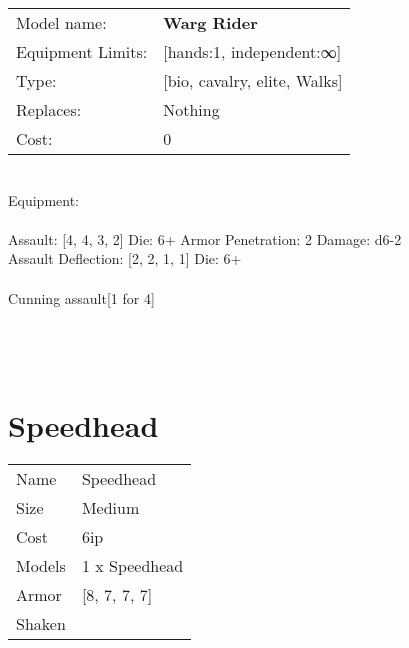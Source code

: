 \noindent
\begin{tabular}{ll}
Model name: &{\bf Warg Rider } \\
Equipment Limits: &[hands:1, independent:∞] \\
Type: &[bio, cavalry, elite, Walks] \\
Replaces: &Nothing \\
Cost: & 0\\
\end{tabular}
\ \\
Equipment:  \\
\ \\
Assault: [4, 4, 3, 2] Die: 6+ Armor Penetration: 2 Damage: d6-2 \\
Assault Deflection: [2, 2, 1, 1] Die: 6+\\
\\ 
Cunning assault[1 for 4]\\ 
 
\ \\

\ \\
 
\ \\













\clearpage

\section{ Speedhead }

\begin{tabular}{ll}
  Name & Speedhead \\
  Size & Medium\\
  Cost & 6ip\\
  Models & 1 x Speedhead\\
  Armor & [8, 7, 7, 7]\\
  Shaken & \\
\end{tabular}

\noindent 

